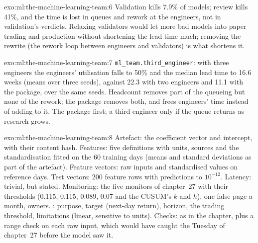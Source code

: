 \begin{solution}{exo:ml:the-machine-learning-team:6}
Validation kills 7.9\% of models; review kills 41\%, and the time is lost in queues and rework at the engineers, not in
validation's verdicts. Relaxing validators would let more bad models into paper trading and production without shortening the
lead time much; removing the rewrite (the rework loop between engineers and validators) is what shortens it.
\end{solution}

\begin{solution}{exo:ml:the-machine-learning-team:7}
\texttt{ml\_team.third\_engineer}: with three engineers the engineers' utilisation falls to 50\% and the median lead time to 16.6
weeks (means over three seeds), against 22.3 with two engineers and 11.1 with the package, over the same seeds. Headcount removes
part of the queueing but none of the rework; the package removes both, and frees engineers' time instead of adding to it. The
package first; a third engineer only if the queue returns as research grows.
\end{solution}

\begin{solution}{exo:ml:the-machine-learning-team:8}
Artefact: the coefficient vector and intercept, with their content hash. Features: five definitions with units, sources and the
standardisation fitted on the 60 training days (means and standard deviations as part of the artefact). Feature vectors: raw
inputs and standardised values on reference days. Test vectors: 200 feature rows with predictions to $10^{-12}$. Latency: trivial,
but stated. Monitoring: the five monitors of chapter~27 with their thresholds (0.115, 0.115, 0.089, 0.07 and the CUSUM's $k$ and
$h$), one false page a month, owners. : purpose, target (next-day return), horizon, the trading threshold, limitations
(linear, sensitive to units). Checks: as in the chapter, plus a range check on each raw input, which would have caught the
Tuesday of chapter~27 before the model saw it.
\end{solution}


